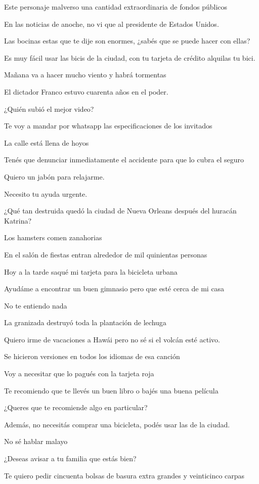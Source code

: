 Este personaje malverso una cantidad extraordinaria de fondos públicos

En las noticias de anoche, no vi que al presidente de Estados Unidos.

Las bocinas estas que te dije son enormes, ¿sabés que se puede hacer con ellas?

Es muy fácil usar las bicis de la ciudad, con tu tarjeta de crédito alquilas tu bici.

Mañana va a hacer mucho viento y habrá tormentas

El dictador Franco estuvo cuarenta años en el poder.

¿Quién subió el mejor video?

Te voy a mandar por whatsapp las especificaciones de los invitados

La calle está llena de hoyos

Tenés que denunciar inmediatamente el accidente para que lo cubra el seguro

Quiero un jabón para relajarme.

Necesito tu ayuda urgente.

¿Qué tan destruida quedó la ciudad de Nueva Orleans después del huracán Katrina?

Los hamsters comen zanahorias

En el salón de fiestas entran alrededor de mil quinientas personas

Hoy a la tarde saqué mi tarjeta para la bicicleta urbana

Ayudáme a encontrar un buen gimnasio pero que esté cerca de mi casa

No te entiendo nada

La granizada destruyó toda la plantación de lechuga

Quiero irme de vacaciones a Hawái pero no sé si el volcán esté activo.

Se hicieron versiones en todos los idiomas de esa canción

Voy a necesitar que lo pagués con la tarjeta roja

Te recomiendo que te llevés un buen libro o bajés una buena película

¿Queres que te recomiende algo en particular?

Además, no necesitás comprar una bicicleta, podés usar las de la ciudad.

No sé hablar malayo

¿Deseas avisar a tu familia que estás bien?

Te quiero pedir cincuenta bolsas de basura extra grandes y veinticinco carpas

